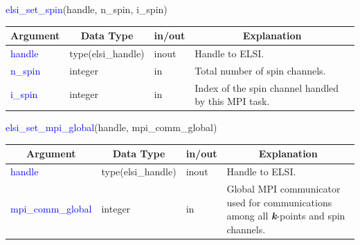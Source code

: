 \documentclass{report}
\begin{document}
\newpage
\begin{labeling}{\hspace{6cm}}
\item [\hspace{0.3cm} \textcolor{blue}{elsi\_set\_spin}(handle, n\_spin, i\_spin)]
\end{labeling}

\begin{tabular}[]{|p{30mm}|p{30mm}|p{15mm}|p{90mm}|}
\hline
\multicolumn{1}{|c|}{\textbf{Argument}} & \multicolumn{1}{c|}{\textbf{Data Type}} & \multicolumn{1}{c|}{\textbf{in/out}} & \multicolumn{1}{c|}{\textbf{Explanation}}\\
\hline
\textcolor{blue}{handle}  & type(elsi\_handle) & inout & Handle to ELSI.\\
\hline
\textcolor{blue}{n\_spin} & integer            & in    & Total number of spin channels.\\
\hline
\textcolor{blue}{i\_spin} & integer            & in    & Index of the spin channel handled by this MPI task.\\
\hline
\end{tabular}

\begin{labeling}{\hspace{6cm}}
\item [\hspace{0.3cm} \textcolor{blue}{elsi\_set\_mpi\_global}(handle, mpi\_comm\_global)]
\end{labeling}

\begin{tabular}[]{|p{30mm}|p{30mm}|p{15mm}|p{90mm}|}
\hline
\multicolumn{1}{|c|}{\textbf{Argument}} & \multicolumn{1}{c|}{\textbf{Data Type}} & \multicolumn{1}{c|}{\textbf{in/out}} & \multicolumn{1}{c|}{\textbf{Explanation}}\\
\hline
\textcolor{blue}{handle}            & type(elsi\_handle) & inout & Handle to ELSI.\\
\hline
\textcolor{blue}{mpi\_comm\_global} & integer            & in    & Global MPI communicator used for communications among all \textbf{\textit{k}}-points and spin channels.\\
\hline
\end{tabular}
\end{document}
